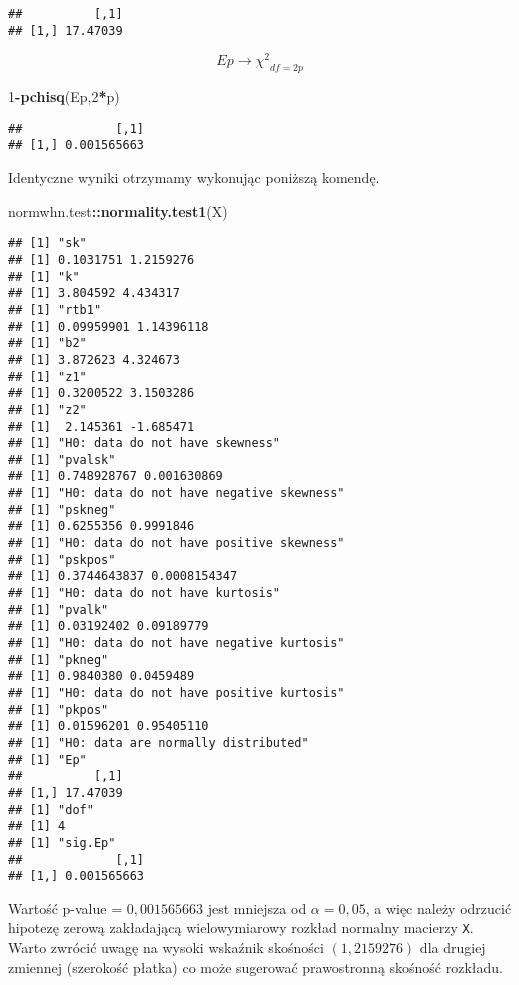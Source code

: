 \documentclass[polish,]{book}
\newenvironment{Shaded}{\begin{snugshade}}{\end{snugshade}}
\newcommand{\DecValTok}[1]{\textcolor[rgb]{0.00,0.00,0.81}{#1}}
\newcommand{\KeywordTok}[1]{\textcolor[rgb]{0.13,0.29,0.53}{\textbf{#1}}}
\newcommand{\NormalTok}[1]{#1}
\newcommand{\OperatorTok}[1]{\textcolor[rgb]{0.81,0.36,0.00}{\textbf{#1}}}
\begin{document}
\begin{verbatim}
##          [,1]
## [1,] 17.47039
\end{verbatim}

\begin{equation}
Ep\longrightarrow {{\chi}^{2}}_{df=2p}
\label{eq:wz1129}
\end{equation}

\begin{Shaded}
\begin{Highlighting}[]
\DecValTok{1}\OperatorTok{-}\KeywordTok{pchisq}\NormalTok{(Ep,}\DecValTok{2}\OperatorTok{*}\NormalTok{p)}
\end{Highlighting}
\end{Shaded}

\begin{verbatim}
##             [,1]
## [1,] 0.001565663
\end{verbatim}

Identyczne wyniki otrzymamy wykonując poniższą komendę.

\begin{Shaded}
\begin{Highlighting}[]
\NormalTok{normwhn.test}\OperatorTok{::}\KeywordTok{normality.test1}\NormalTok{(X)}
\end{Highlighting}
\end{Shaded}

\begin{verbatim}
## [1] "sk"
## [1] 0.1031751 1.2159276
## [1] "k"
## [1] 3.804592 4.434317
## [1] "rtb1"
## [1] 0.09959901 1.14396118
## [1] "b2"
## [1] 3.872623 4.324673
## [1] "z1"
## [1] 0.3200522 3.1503286
## [1] "z2"
## [1]  2.145361 -1.685471
## [1] "H0: data do not have skewness"
## [1] "pvalsk"
## [1] 0.748928767 0.001630869
## [1] "H0: data do not have negative skewness"
## [1] "pskneg"
## [1] 0.6255356 0.9991846
## [1] "H0: data do not have positive skewness"
## [1] "pskpos"
## [1] 0.3744643837 0.0008154347
## [1] "H0: data do not have kurtosis"
## [1] "pvalk"
## [1] 0.03192402 0.09189779
## [1] "H0: data do not have negative kurtosis"
## [1] "pkneg"
## [1] 0.9840380 0.0459489
## [1] "H0: data do not have positive kurtosis"
## [1] "pkpos"
## [1] 0.01596201 0.95405110
## [1] "H0: data are normally distributed"
## [1] "Ep"
##          [,1]
## [1,] 17.47039
## [1] "dof"
## [1] 4
## [1] "sig.Ep"
##             [,1]
## [1,] 0.001565663
\end{verbatim}

Wartość p-value = \(0,001565663\) jest mniejsza od \(\alpha = 0,05\), a więc należy odrzucić
hipotezę zerową zakładającą wielowymiarowy rozkład normalny macierzy \texttt{X}. Warto zwrócić uwagę na wysoki wskaźnik skośności \((1,2159276)\) dla drugiej zmiennej
(szerokość płatka) co może sugerować prawostronną skośność rozkładu.
\end{document}
